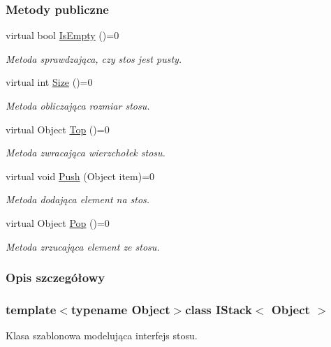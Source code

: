 \subsubsection*{Metody publiczne}
\begin{DoxyCompactItemize}
\item 
virtual bool \hyperlink{class_i_stack_a5f897eeae7852113a299787faceda2c6}{Is\-Empty} ()=0
\begin{DoxyCompactList}\small\item\em Metoda sprawdzająca, czy stos jest pusty. \end{DoxyCompactList}\item 
virtual int \hyperlink{class_i_stack_a4d003c4795b2335a9038fd988875d72e}{Size} ()=0
\begin{DoxyCompactList}\small\item\em Metoda obliczająca rozmiar stosu. \end{DoxyCompactList}\item 
virtual Object \hyperlink{class_i_stack_a25ec1b2c853e59e4ec05a0579bf817ff}{Top} ()=0
\begin{DoxyCompactList}\small\item\em Metoda zwracająca wierzchołek stosu. \end{DoxyCompactList}\item 
virtual void \hyperlink{class_i_stack_a94d298580de241fd145689925a101fb1}{Push} (Object item)=0
\begin{DoxyCompactList}\small\item\em Metoda dodająca element na stos. \end{DoxyCompactList}\item 
virtual Object \hyperlink{class_i_stack_a09d0e8878c0c2c14c7f124f41786512f}{Pop} ()=0
\begin{DoxyCompactList}\small\item\em Metoda zrzucająca element ze stosu. \end{DoxyCompactList}\end{DoxyCompactItemize}


\subsubsection{Opis szczegółowy}
\subsubsection*{template$<$typename Object$>$class I\-Stack$<$ Object $>$}

Klasa szablonowa modelująca interfejs stosu. 

